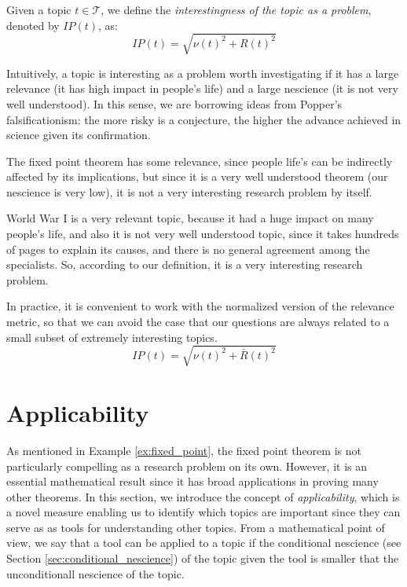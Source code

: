 \begin{definition}
Given a topic $t \in \mathcal{T}$, we define the \emph{interestingness of the topic as a problem}, denoted by $IP(t)$, as:
\[
IP(t) = \sqrt{ \nu(t)^2 +  R(t)^2 }
\]
\end{definition}

Intuitively, a topic is interesting as a problem worth investigating if it has a large relevance (it has high impact in people's life) and a large nescience (it is not very well understood). In this sense, we are borrowing ideas from Popper's falsificationism: the more risky is a conjecture, the higher the advance achieved in science given its confirmation.

\begin{example}
\label{ex:fixed_point}
The fixed point theorem has some relevance, since people life's can be indirectly affected by its implications, but since it is a very well understood theorem (our nescience is very low), it is not a very interesting research problem by itself.

World War I is a very relevant topic, because it had a huge impact on many people's life, and also it is not very well understood topic, since it takes hundreds of pages to explain its causes, and there is no general agreement among the specialists. So, according to our definition, it is a very interesting research problem.
\end{example}

In practice, it is convenient to work with the normalized version of the relevance metric, so that we can avoid the case that our questions are always related to a small subset of extremely interesting topics.
\[
IP(t) = \sqrt{ \nu(t)^2 +  \bar{R}(t)^2 }
\]

%
%

\section{Applicability}

As mentioned in Example \ref{ex:fixed_point}, the fixed point theorem is not particularly compelling as a research problem on its own. However, it is an essential mathematical result since it has broad applications in proving many other theorems. In this section, we introduce the concept of \emph{applicability}, which is a novel measure enabling us to identify which topics are important since they can serve as as tools for understanding other topics. From a mathematical point of view, we say that a tool can be applied to a topic if the conditional nescience (see Section \ref{sec:conditional_nescience}) of the topic given the tool is smaller that the unconditionall nescience of the topic.


